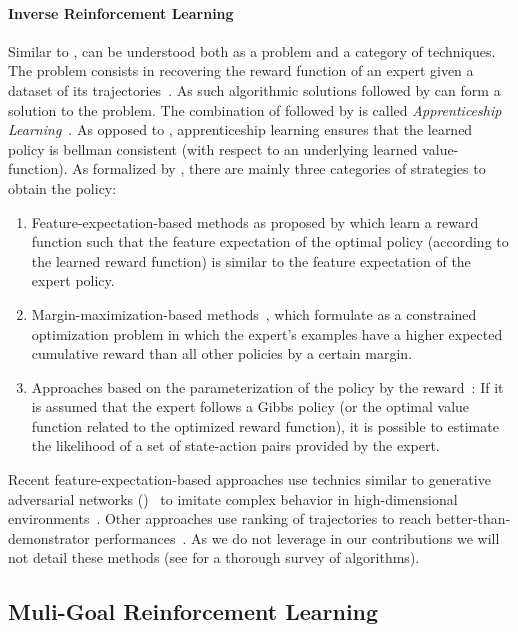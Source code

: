 \paragraph{Inverse Reinforcement Learning}

Similar to \rl, \irl can be understood both as a problem and a category of techniques. The \irl problem consists in recovering the reward function of an expert given a dataset of its trajectories~\citep{ng2000irl}. As such \irl algorithmic solutions followed by \rl can form a solution to the \il problem. The combination of \irl followed by \rl is called \textit{Apprenticeship Learning}~\citep{abbeel2004apprenticeship}. As opposed to \bc, apprenticeship learning ensures that the learned policy is bellman consistent (with respect to an underlying learned value-function). As formalized by \citet{klein2011apprenticeship}, there are mainly three categories of strategies to obtain the policy:
\begin{enumerate}[noitemsep]
\item Feature-expectation-based methods as proposed by \citet{ziebart2008maxentirl} which learn a reward function such that the feature expectation of the optimal policy (according to the learned reward function) is similar to the feature expectation of the expert policy. 
\item Margin-maximization-based methods~\citep{ratlif2006maxmargin}, which formulate \irl as a constrained optimization problem in which the expert's examples have a higher expected cumulative reward than all other policies by a certain margin.
\item Approaches based on the parameterization of the policy by the reward~\citep{neu2007apprenticeship}: If it is assumed that the expert follows a Gibbs policy (or the optimal value function related to the optimized reward function), it is possible to estimate the likelihood of a set of state-action pairs provided by the expert.
\end{enumerate}
%
Recent feature-expectation-based approaches use technics similar to generative adversarial networks (\gan)~\citep{goodfellow2014generative} to imitate complex behavior in high-dimensional environments~\citep{ho2016gail}. Other approaches use ranking of trajectories to reach better-than-demonstrator performances~\citep{brown2020better}. As we do not leverage \irl in our contributions we will not detail these methods (see \citet{arora_survey_2021} for a thorough survey of \irl algorithms).


\subsection{Muli-Goal Reinforcement Learning}

